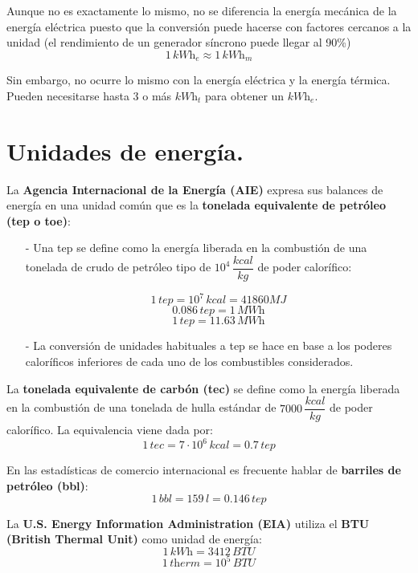 	Aunque no es exactamente lo mismo, no se diferencia la energía mecánica de la energía eléctrica
	puesto que la conversión puede hacerse con factores cercanos a la unidad (el rendimiento de un
	generador síncrono puede llegar al 90\%)
	\[1\, \textit{kWh}_e \approx 1\, \textit{kWh}_m\]
	
	Sin embargo, no ocurre lo mismo con la energía eléctrica y la energía térmica. Pueden necesitarse
	hasta 3 o más $\textit{kWh}_t$ para obtener un $\textit{kWh}_e$.
	
\section{Unidades de energía.}
	La \textbf{Agencia Internacional de la Energía (AIE)} expresa sus balances de energía en una unidad
	común que es la \textbf{tonelada equivalente de petróleo (tep o toe)}:
	\begin{itemize}
		\item[-] Una tep se define como la energía liberada en la combustión de una tonelada de crudo de
		petróleo tipo de $10^4 \, \dfrac{\textit{kcal}}{\textit{kg}}$ de poder calorífico:
		
		\[1\,\textit{tep} = 10^7\,\textit{kcal}=41860\textit{MJ}\]
		\[0.086\,\textit{tep} = 1\, \textit{MWh}\]
		\[1\,\textit{tep} = 11.63\, \textit{MWh}\]
		
		\item[-] La conversión de unidades habituales a tep se hace en base a los poderes caloríficos inferiores
		de cada uno de los combustibles considerados.
	\end{itemize}
	
	La \textbf{tonelada equivalente de carbón (tec)} se define como la energía liberada en la combustión de
	una tonelada de hulla estándar de $7000 \, \dfrac{\textit{kcal}}{\textit{kg}}$ de poder calorífico. La equivalencia viene dada por: 
	\[1\,\textit{tec}=7\cdot10^6\,\textit{kcal} = 0.7\,\textit{tep}\]
	
	En las estadísticas de comercio internacional es frecuente hablar de \textbf{barriles de petróleo (bbl)}:
	\[1\,\textit{bbl} = 159\,\textit{l} = 0.146\,\textit{tep}\]
	
	La \textbf{U.S. Energy Information Administration (EIA)} utiliza el \textbf{BTU (British Thermal Unit)} como unidad de energía:
	\[1\,\textit{kWh} = 3412\,\textit{BTU}\]
	\[1\,\textit{therm} = 10^5\,\textit{BTU}\]
	
